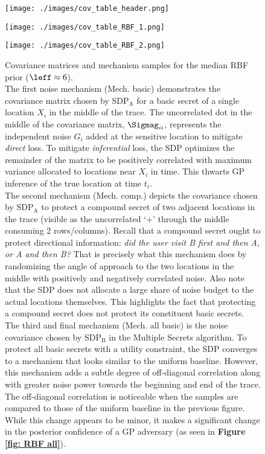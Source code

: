 \begin{figure*}[h] \ContinuedFloat
	\begin{subfigure}[b]{1\textwidth}
		\centering
		\texttt{[image: ./images/cov\_table\_header.png]}
	\end{subfigure}
	\begin{subfigure}[b]{1\textwidth}
		\centering
		\texttt{[image: ./images/cov\_table\_RBF\_1.png]}
	\end{subfigure}
	\begin{subfigure}[b]{1\textwidth}
		\centering
		\texttt{[image: ./images/cov\_table\_RBF\_2.png]}
		\caption{
			Covariance matrices and mechanism samples for the median RBF prior ($\leff \approx 6$). 
			\vspace{2mm} \\
			The first noise mechanism (Mech. basic) demonstrates the covariance matrix chosen by $\text{SDP}_\text{A}$ for a basic secret of a single location $X_i$ in the middle of the trace. The uncorrelated dot in the middle of the covariance matrix, $\Sigmag_{ii}$, represents the independent noise $G_i$ added at the sensitive location to mitigate \emph{direct} loss. To mitigate \emph{inferential} loss, the SDP optimizes the remainder of the matrix to be positively correlated with maximum variance allocated to locations near $X_i$ in time. This thwarts GP inference of the true location at time $t_i$. 
			\vspace{2mm} \\
			The second mechanism (Mech. comp.) depicts the covariance chosen by $\text{SDP}_\text{A}$ to protect a compound secret of two adjacent locations in the trace (visible as the uncorrelated `$+$' through the middle consuming 2 rows/columns). Recall that a compound secret ought to protect directional information: \emph{did the user visit B first and then A, or A and then B?} That is precisely what this mechanism does by randomizing the angle of approach to the two locations in the middle with positively and negatively correlated noise. Also note that the SDP does not allocate a large share of noise budget to the actual locations themselves. This highlights the fact that protecting a compound secret does not protect its constituent basic secrets.
			\vspace{2mm} \\
			The third and final mechanism (Mech. all basic) is the noise covariance chosen by $\text{SDP}_\text{B}$ in the Multiple Secrets algorithm. To protect all basic secrets with a utility constraint, the SDP converges to a mechanism that looks similar to the uniform baseline. However, this mechanism adds a subtle degree of off-diagonal correlation along with greater noise power towards the beginning and end of the trace. The off-diagonal correlation is noticeable when the samples are compared to those of the uniform baseline in the previous figure. While this change appears to be minor, it makes a significant change in the posterior confidence of a GP adversary (as seen in \textbf{Figure \ref{fig: RBF all}}). 
			}
		\label{fig: cov table rbf}
	\end{subfigure}
\end{figure*}

